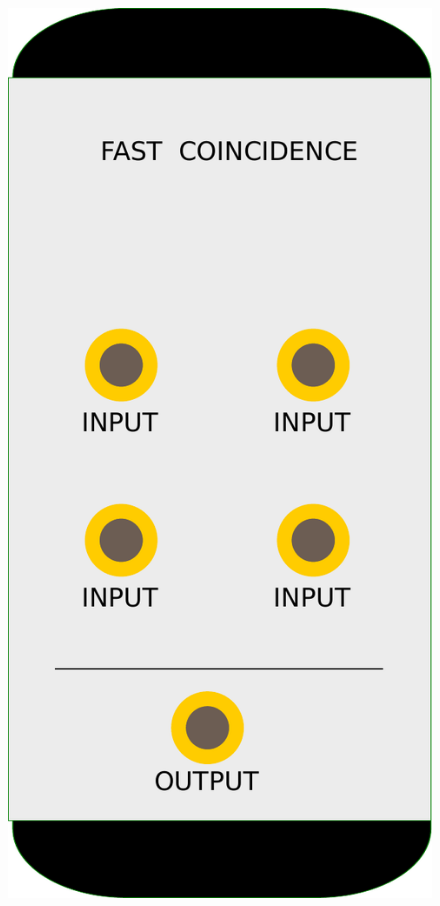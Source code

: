\begin{figure}[ht]
  \includegraphics[height=0.25\textheight]{BilderAufbau/koinzidenz.pdf}

\end{figure}
